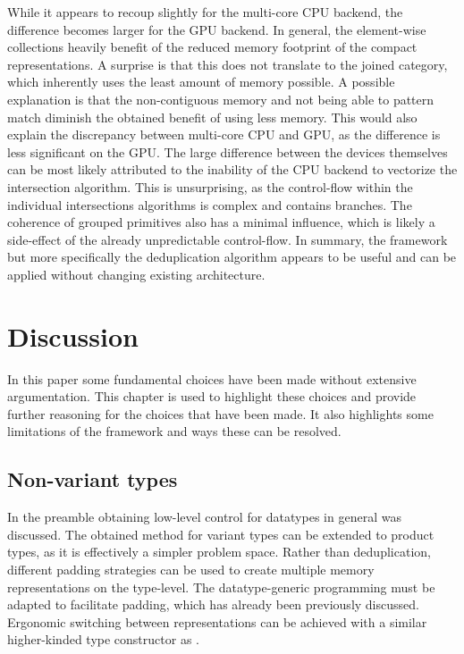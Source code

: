 \documentclass{article}
\newcommand{\type}[1]{\smash{\colorbox{codegray}{\texttt{#1}}}}
\begin{document}
While it appears to recoup slightly for the multi-core CPU backend, the difference becomes larger for the GPU backend.
In general, the element-wise collections heavily benefit of the reduced memory footprint of the compact representations.
A surprise is that this does not translate to the joined category, which inherently uses the least amount of memory possible.
A possible explanation is that the non-contiguous memory and not being able to pattern match diminish the obtained benefit of using less memory.
This would also explain the discrepancy between multi-core CPU and GPU, as the difference is less significant on the GPU.
The large difference between the devices themselves can be most likely attributed to the inability of the CPU backend to vectorize the intersection algorithm.
This is unsurprising, as the control-flow within the individual intersections algorithms is complex and contains branches.  
The coherence of grouped primitives also has a minimal influence, which is likely a side-effect of the already unpredictable control-flow.
In summary, the framework but more specifically the deduplication algorithm appears to be useful and can be applied without changing existing architecture.

\newpage

\section{Discussion}

In this paper some fundamental choices have been made without extensive argumentation.
This chapter is used to highlight these choices and provide further reasoning for the choices that have been made.
It also highlights some limitations of the framework and ways these can be resolved.

\subsection{Non-variant types}

In the preamble obtaining low-level control for datatypes in general was discussed.
The obtained method for variant types can be extended to product types, as it is effectively a simpler problem space.
Rather than deduplication, different padding strategies can be used to create multiple memory representations on the type-level.
The datatype-generic programming must be adapted to facilitate padding, which has already been previously discussed.
Ergonomic switching between representations can be achieved with a similar higher-kinded type constructor as \type{Variant}.
\end{document}
